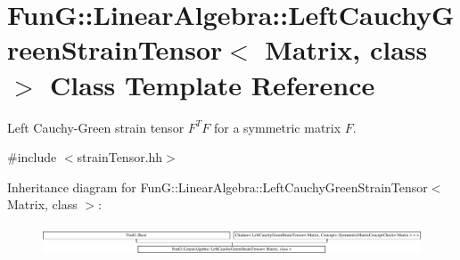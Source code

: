 \hypertarget{classFunG_1_1LinearAlgebra_1_1LeftCauchyGreenStrainTensor}{\section{Fun\-G\-:\-:Linear\-Algebra\-:\-:Left\-Cauchy\-Green\-Strain\-Tensor$<$ Matrix, class $>$ Class Template Reference}
\label{classFunG_1_1LinearAlgebra_1_1LeftCauchyGreenStrainTensor}
}


Left Cauchy-\/\-Green strain tensor $ F^T F $ for a symmetric matrix $ F $.  




{\ttfamily \#include $<$strain\-Tensor.\-hh$>$}

Inheritance diagram for Fun\-G\-:\-:Linear\-Algebra\-:\-:Left\-Cauchy\-Green\-Strain\-Tensor$<$ Matrix, class $>$\-:\begin{figure}[H]
\begin{center}
\leavevmode
\includegraphics[height=0.898876cm]{classFunG_1_1LinearAlgebra_1_1LeftCauchyGreenStrainTensor}
\end{center}
\end{figure}

